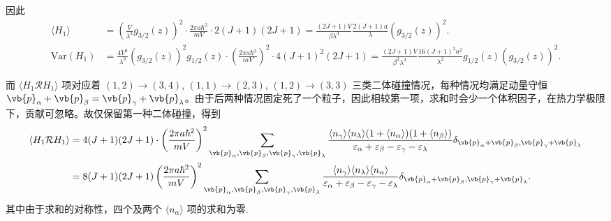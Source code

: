 因此
\begin{align*}
	\langle H_{1} \rangle &= \left( \frac{V}{\lambda^{3}} g_{3/2}(z) \right)^{2} \cdot \frac{2\pi a \hbar^{2}}{m V} \cdot 2(J+1)(2J+1) = \frac{(2J+1) V}{\beta \lambda^{3}} \frac{2(J+1) a}{\lambda} (g_{3/2}(z))^{2}. \\
	\mathrm{Var}(H_{1}) &= \frac{4V^{3}}{\lambda^{9}} (g_{3/2}(z))^{2} g_{1/2}(z) \cdot \left( \frac{2\pi a \hbar^{2}}{m V} \right)^{2} \cdot 4(J+1)^{2}(2J+1) = \frac{(2J+1) V}{\beta^{2} \lambda^{3}} \frac{16(J+1)^{2} a^{2}}{\lambda^{2}} g_{1/2}(z) (g_{3/2}(z))^{2}.
\end{align*}

而 \(\langle H_{1} \mathcal{R} H_{1} \rangle\) 项对应着 \((1,2) \to (3,4)\), \((1,1) \to (2,3)\), \((1,2) \to (3,3)\) 三类二体碰撞情况，每种情况均满足动量守恒 \(\vb{p}_{\alpha} + \vb{p}_{\beta} = \vb{p}_{\gamma} + \vb{p}_{\lambda}\)。由于后两种情况固定死了一个粒子，因此相较第一项，求和时会少一个体积因子，在热力学极限下，贡献可忽略。故仅保留第一种二体碰撞，得到
\begin{align*}
	\langle H_{1} \mathcal{R} H_{1} \rangle &= 4(J+1)(2J+1) \cdot \left( \frac{2\pi a \hbar^{2}}{m V} \right)^{2} \sum_{\vb{p}_{\alpha},\vb{p}_{\beta},\vb{p}_{\gamma},\vb{p}_{\lambda}} \frac{\langle n_{\gamma} \rangle \langle n_{\lambda} \rangle (1 + \langle n_{\alpha} \rangle) (1 + \langle n_{\beta} \rangle)}{\varepsilon_{\alpha} + \varepsilon_{\beta} - \varepsilon_{\gamma} - \varepsilon_{\lambda}} \delta_{\vb{p}_{\alpha} + \vb{p}_{\beta}, \vb{p}_{\gamma} + \vb{p}_{\lambda}} \\
	&= 8(J+1)(2J+1) \left( \frac{2\pi a \hbar^{2}}{m V} \right)^{2} \sum_{\vb{p}_{\alpha},\vb{p}_{\beta},\vb{p}_{\gamma},\vb{p}_{\lambda}} \frac{\langle n_{\gamma} \rangle \langle n_{\lambda} \rangle \langle n_{\alpha} \rangle}{\varepsilon_{\alpha} + \varepsilon_{\beta} - \varepsilon_{\gamma} - \varepsilon_{\lambda}} \delta_{\vb{p}_{\alpha} + \vb{p}_{\beta}, \vb{p}_{\gamma} + \vb{p}_{\lambda}}.
\end{align*}
其中由于求和的对称性，四个及两个 \(\langle n_{\alpha} \rangle\) 项的求和为零.

